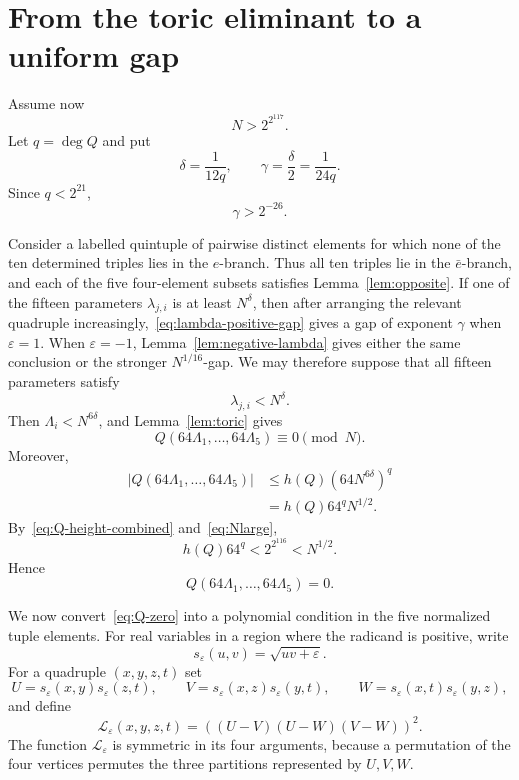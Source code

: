 \documentclass[11pt]{amsart}
\theoremstyle{remark}
\newcommand{\eps}{\varepsilon}
\begin{document}
\section{From the toric eliminant to a uniform gap}

Assume now
\begin{equation}\label{eq:Nlarge}
 N>2^{2^{117}}.
\end{equation}
Let $q=\deg Q$ and put
\[
 \delta=\frac1{12q},\qquad \gamma=\frac\delta2=\frac1{24q}.
\]
Since $q<2^{21}$,
\begin{equation}
 \gamma>2^{-26}.
\end{equation}

Consider a labelled quintuple of pairwise distinct elements for which none of
the ten determined triples lies in the $e$-branch. Thus all ten triples lie
in the $\bar e$-branch, and each of the five four-element subsets satisfies
Lemma~\ref{lem:opposite}. If one of the fifteen parameters
$\lambda_{j,i}$ is at least $N^\delta$, then after arranging the relevant
quadruple increasingly,~\eqref{eq:lambda-positive-gap} gives a gap of
exponent $\gamma$ when $\eps=1$. When $\eps=-1$,
Lemma~\ref{lem:negative-lambda} gives either the same conclusion or the
stronger $N^{1/16}$-gap. We may therefore suppose that all fifteen parameters
satisfy
\[
 \lambda_{j,i}<N^\delta.
\]
Then $\Lambda_i<N^{6\delta}$, and Lemma~\ref{lem:toric} gives
\[
 Q(64\Lambda_1,\ldots,64\Lambda_5)\equiv0\pmod N.
\]
Moreover,
\[
 \begin{split}
 |Q(64\Lambda_1,\ldots,64\Lambda_5)|
 &\le h(Q)(64N^{6\delta})^q\\
 &=h(Q)64^qN^{1/2}.
 \end{split}
\]
By~\eqref{eq:Q-height-combined} and~\eqref{eq:Nlarge},
\[
 h(Q)64^q<2^{2^{116}}<N^{1/2}.
\]
Hence
\begin{equation}\label{eq:Q-zero}
 Q(64\Lambda_1,\ldots,64\Lambda_5)=0.
\end{equation}

We now convert~\eqref{eq:Q-zero} into a polynomial condition in the five
normalized tuple elements. For real variables in a region where the radicand
is positive, write
\[
 s_\eps(u,v)=\sqrt{uv+\eps}.
\]
For a quadruple $(x,y,z,t)$ set
\[
 U=s_\eps(x,y)s_\eps(z,t),\qquad
 V=s_\eps(x,z)s_\eps(y,t),\qquad
 W=s_\eps(x,t)s_\eps(y,z),
\]
and define
\begin{equation}
 \mathcal L_\eps(x,y,z,t)=((U-V)(U-W)(V-W))^2.
\end{equation}
The function $\mathcal L_\eps$ is symmetric in its four arguments, because
a permutation of the four vertices permutes the three partitions
represented by $U,V,W$.
\end{document}

